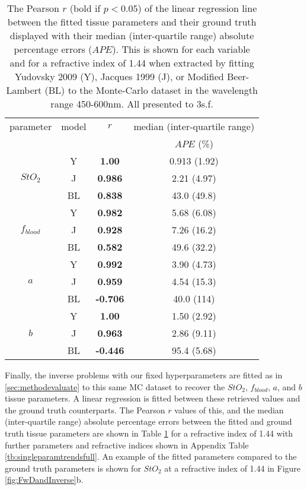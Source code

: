\begin{table}[htpb]
    \centering
    \caption{The  Pearson $r$ (bold if $p<0.05$) of the linear regression line between the fitted tissue parameters and their ground truth displayed with their median (inter-quartile range) absolute percentage errors ($APE$). This is shown for each variable and for a refractive index of 1.44 when extracted by fitting Yudovsky 2009 (Y), Jacques 1999 (J), or Modified Beer-Lambert (BL) to the Monte-Carlo dataset in the wavelength range 450-600nm. All presented to 3s.f.}
    \begin{tabular}{|cc|cc|}
        \hline
        parameter & model & $r$ & median (inter-quartile range) \\
        & &  & $APE$ (\%)\\
        \hline
        \multirow{3}{*}{$StO_2$} & Y & \textbf{1.00} & 0.913 (1.92) \\
        & J & \textbf{0.986} & 2.21 (4.97) \\
        & BL & \textbf{0.838} & 43.0 (49.8) \\
        \hline
        \multirow{3}{*}{$f_{blood}$} & Y & \textbf{0.982} & 5.68 (6.08) \\
        & J & \textbf{0.928} & 7.26 (16.2) \\
        & BL & \textbf{0.582} & 49.6 (32.2) \\
        \hline
        \multirow{3}{*}{$a$} & Y & \textbf{0.992} & 3.90 (4.73) \\
        & J & \textbf{0.959} & 4.54 (15.3) \\
        & BL & \textbf{-0.706} & 40.0 (114) \\
        \hline
        \multirow{3}{*}{$b$} & Y & \textbf{1.00} & 1.50 (2.92) \\
        & J & \textbf{0.963} & 2.86 (9.11) \\
        & BL & \textbf{-0.446} & 95.4 (5.68) \\
        \hline
    \end{tabular}
    \label{tb:singleparamtrends}
\end{table}

Finally, the inverse problems with our fixed hyperparameters are fitted as in \ref{sec:methodevaluate} to this same MC dataset to recover the $StO_2$, $f_{blood}$, $a$, and $b$ tissue parameters. A linear regression is fitted between these retrieved values and the ground truth counterparts. The Pearson $r$ values of this, and the median (inter-quartile range) absolute percentage errors between the fitted and ground truth tissue parameters are shown in Table \ref{tb:singleparamtrends} for a refractive index of 1.44 with further parameters and refractive indices shown in Appendix Table \ref{tb:singleparamtrendsfull}. An example of the fitted parameters compared to the ground truth parameters is shown for $StO_2$ at a refractive index of 1.44 in Figure \ref{fig:FwDandInverse}b. 



